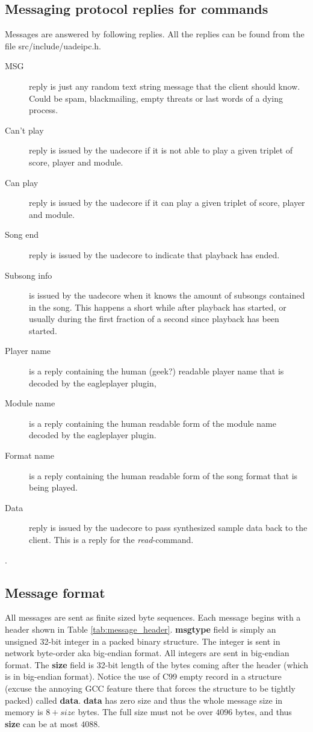 \documentclass{article}
\begin{document}
\subsection{Messaging protocol replies for commands}

Messages are answered by following replies.
All the replies can be found from the file \mbox{src/include/uadeipc.h}.

\begin{description}
\item [MSG] reply is just any random text string message that the client should
know. Could be spam, blackmailing, empty threats or last words of a dying
process.
\item [Can't play] reply is issued by the uadecore if it is not able to play
a given triplet of score, player and module.
\item [Can play] reply is issued by the uadecore if it can play a given
triplet of score, player and module.
\item [Song end] reply is issued by the uadecore to indicate that playback
has ended.
\item [Subsong info] is issued by the uadecore when it knows the amount of
subsongs contained in the song. This happens a short while after playback
has started, or usually during the first fraction of a second since
playback has been started.
\item [Player name] is a reply containing the human (geek?) readable player
name that is decoded by the eagleplayer plugin,
\item [Module name] is a reply containing the human readable form of the
module name decoded by the eagleplayer plugin.
\item [Format name] is a reply containing the human readable form
of the song format that is being played.
\item [Data] reply is issued by the uadecore to pass synthesized sample
data back to the client. This is a reply for the \emph{read}-command.
\end{description}.

\subsection{Message format}
All messages are sent as finite sized byte sequences. Each message begins
with a header shown in Table \ref{tab:message_header}.
\textbf{msgtype} field is simply an unsigned 32-bit integer in a packed
binary structure. The integer is sent in network byte-order aka big-endian
format. All integers are sent in big-endian format.
The \textbf{size} field is 32-bit length of the bytes coming after the header
(which is in big-endian format).
Notice the use of C99 empty record in a structure (excuse the annoying GCC
feature there that forces the structure to be tightly packed) called
\textbf{data}. \textbf{data} has zero
size and thus the whole message size in memory is $8 + size$ bytes. The
full size must not be over $4096$ bytes, and thus \textbf{size} can be
at most $4088$.
\end{document}
